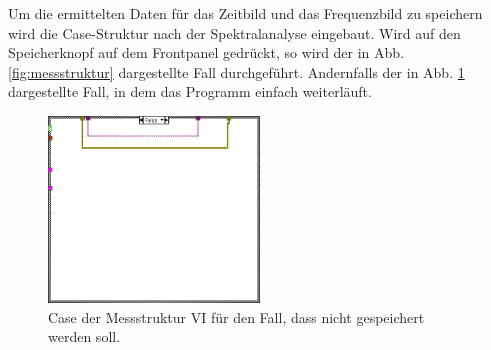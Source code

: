 		Um die ermittelten Daten für das Zeitbild und das Frequenzbild zu speichern wird die Case-Struktur nach der Spektralanalyse eingebaut.
		Wird auf den Speicherknopf auf dem Frontpanel gedrückt, so wird der in Abb. \ref{fig:messstruktur} dargestellte Fall durchgeführt.
		Andernfalls der in Abb. \ref{fig:messstruktur_case} dargestellte Fall, in dem das Programm einfach weiterläuft.
		\begin{figure}[H]
			\centering
			\includegraphics[width=0.5\textwidth]{pic/messstruktur_case.png}	
			\caption{Case der Messstruktur VI für den Fall, dass nicht gespeichert werden soll.}
			\label{fig:messstruktur_case}
		\end{figure}
	
